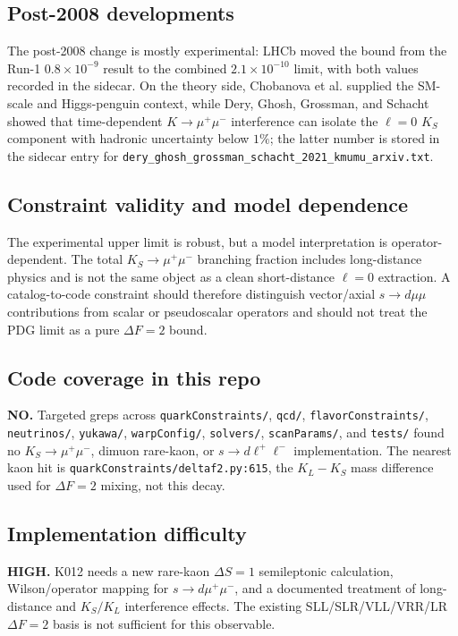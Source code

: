 \subsection*{Post-2008 developments}
The post-2008 change is mostly experimental: LHCb moved the bound from the
Run-1 \(0.8\times10^{-9}\) result to the combined \(2.1\times10^{-10}\)
limit, with both values recorded in the sidecar.  On the theory side,
Chobanova et al. supplied the SM-scale and Higgs-penguin context, while Dery,
Ghosh, Grossman, and Schacht showed that time-dependent
\(K\to\mu^+\mu^-\) interference can isolate the \(\ell=0\) \(K_S\) component
with hadronic uncertainty below \(1\%\); the latter number is stored in the
sidecar entry for \texttt{dery\_ghosh\_grossman\_schacht\_2021\_kmumu\_arxiv.txt}.

\subsection*{Constraint validity and model dependence}
The experimental upper limit is robust, but a model interpretation is
operator-dependent.  The total \(K_S\to\mu^+\mu^-\) branching fraction includes
long-distance physics and is not the same object as a clean short-distance
\(\ell=0\) extraction.  A catalog-to-code constraint should therefore distinguish
vector/axial \(s\to d\mu\mu\) contributions from scalar or pseudoscalar
operators and should not treat the PDG limit as a pure \(\Delta F=2\) bound.

\subsection*{Code coverage in this repo}
\textbf{NO.}  Targeted greps across \texttt{quarkConstraints/}, \texttt{qcd/},
\texttt{flavorConstraints/}, \texttt{neutrinos/}, \texttt{yukawa/},
\texttt{warpConfig/}, \texttt{solvers/}, \texttt{scanParams/}, and
\texttt{tests/} found no \(K_S\to\mu^+\mu^-\), dimuon rare-kaon, or
\(s\to d\ell^+\ell^-\) implementation.  The nearest kaon hit is
\texttt{quarkConstraints/deltaf2.py:615}, the \(K_L-K_S\) mass difference used
for \(\Delta F=2\) mixing, not this decay.

\subsection*{Implementation difficulty}
\textbf{HIGH.}  K012 needs a new rare-kaon \(\Delta S=1\) semileptonic
calculation, Wilson/operator mapping for \(s\to d\mu^+\mu^-\), and a documented
treatment of long-distance and \(K_S/K_L\) interference effects.  The existing
SLL/SLR/VLL/VRR/LR \(\Delta F=2\) basis is not sufficient for this observable.

